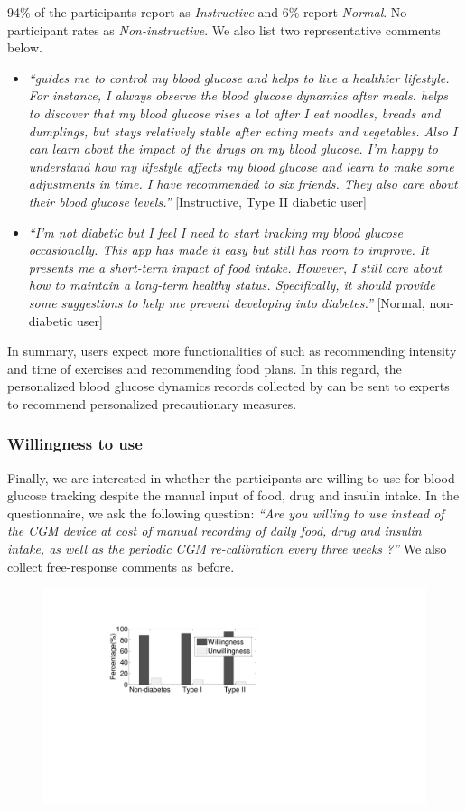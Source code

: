 {94\% of the participants report \sysname as \textit{Instructive} and 6\% report \textit{Normal}.
No participant rates \sysname as \textit{Non-instructive}.
We also list two representative comments below.
\begin{itemize}
  \item
  \textit{``\sysname guides me to control my blood glucose and helps to live a healthier lifestyle.
  For instance, I always observe the blood glucose dynamics after meals.
  \sysname helps to discover that my blood glucose rises a lot after I eat noodles, breads and dumplings, but stays relatively stable after eating meats and vegetables.
  Also I can learn about the impact of the drugs on my blood glucose.
  I'm happy to understand how my lifestyle affects my blood glucose and learn to make some adjustments in time.
  I have recommended \sysname to six friends.
  They also care about their blood glucose levels.''}
  [Instructive, Type II diabetic user]
  \item
  \textit{``I'm not diabetic but I feel I need to start tracking my blood glucose occasionally.
  This app has made it easy but still has room to improve.
  It presents me a short-term impact of food intake.
  However, I still care about how to maintain a long-term healthy status.
  Specifically, it should provide some suggestions to help me prevent developing into diabetes.''}
  [Normal, non-diabetic user]
\end{itemize}
In summary, users expect more functionalities of \sysname such as recommending intensity and time of exercises and recommending food plans.
In this regard, the personalized blood glucose dynamics records collected by \sysname can be sent to  experts to recommend personalized precautionary measures.

\subsubsection{Willingness to use \sysname}
Finally, we are interested in whether the participants are willing to use \sysname for blood glucose tracking despite the manual input of food, drug and insulin intake.
In the questionnaire, we ask the following question:
\textit{``Are you willing to use \sysname instead of the CGM device at cost of manual recording of daily food, drug and insulin intake, as well as the periodic CGM re-calibration every three weeks ?''}
We also collect free-response comments as before.
\begin{figure}[h]
  \centering
  \includegraphics[width=0.4\columnwidth]{./img/willingness.pdf}
  \caption{}
  \label{fig:user_willingness}
\end{figure}

}
